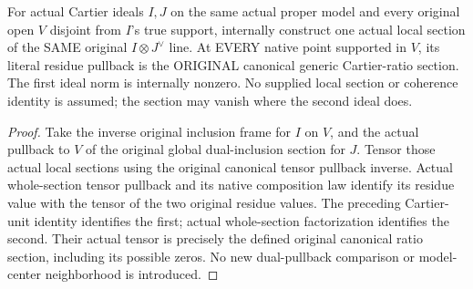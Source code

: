 \begin{lemma}
\label{lem:intrinsic-numerical-cartier-ratio-family-local-section}
\leanok
{}
For actual Cartier ideals $I,J$ on the same actual proper model and every
original open $V$ disjoint from $I$'s true support, internally construct one
actual local section of the SAME original $I\otimes J^\vee$ line. At EVERY
native point supported in $V$, its literal residue pullback is the ORIGINAL
canonical generic Cartier-ratio section. The first ideal norm is internally
nonzero. No supplied local section or coherence identity is assumed; the
section may vanish where the second ideal does.
\end{lemma}
\begin{proof}
Take the inverse original inclusion frame for $I$ on $V$, and the actual
pullback to $V$ of the original global dual-inclusion section for $J$.
Tensor those actual local sections using the original canonical tensor
pullback inverse. Actual whole-section tensor pullback and its native
composition law identify its residue value with the tensor of the two
original residue values. The preceding Cartier-unit identity identifies
the first; actual whole-section factorization identifies the second.
Their actual tensor is precisely the defined original canonical ratio
section, including its possible zeros. No new dual-pullback comparison
or model-center neighborhood is introduced.
\end{proof}

